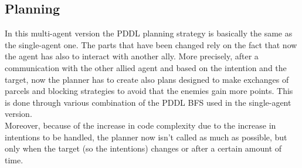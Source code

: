 \documentclass[a4paper, 11pt]{article}
\begin{document}
 
\subsection{Planning}

In this multi-agent version the PDDL planning strategy is basically the same as the single-agent one. The parts that have been changed rely on the fact that now the agent has also to interact with another ally. More precisely, after a communication with the other allied agent and based on the intention and the target, now the planner has to create also plans designed to make exchanges of parcels and blocking strategies to avoid that the enemies gain more points. This is done through various combination of the PDDL BFS used in the single-agent version.\\
Moreover, because of the increase in code complexity due to the increase in intentions to be handled, the planner now isn't called as much as possible, but only when the target (so the intentions) changes or after a certain amount of time.

%
\end{document}
